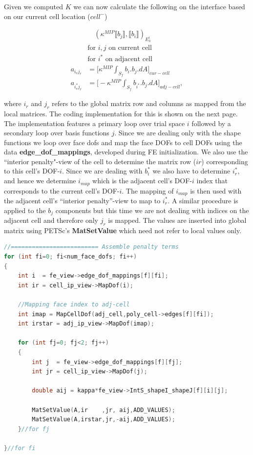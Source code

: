 \documentclass[11pt,letterpaper,titlepage]{article}
\numberwithin{equation}{section}
\begin{document}
Given we computed $K$ we can now calculate the following on the interface
based on our current cell location ($cell^-$)

\begin{equation}
\begin{aligned}
& \quad (\kappa^{MIP} \llbracket b_j \rrbracket,\llbracket b_i \rrbracket)_{E_h^i} \\
&\text{for }i,j \text{ on current cell}\\
&\text{for }i^* \text{ on adjacent cell}\\
a_{i_rj_r} &= \biggr[ \kappa^{MIP} \int_{S_f} b_i.b_j.dA \biggr]_{cur-cell}\\
a_{i_r^*j_r} &= \biggr[ -\kappa^{MIP} \int_{S_f} b_{i^*}.b_j.dA \biggr]_{adj-cell},
\end{aligned}
\end{equation}

where $i_r$ and $j_r$ refers to the global matrix row and columns as 
mapped from the local matrices. The coding implementation for this is 
shown on the next page.
\newline
\newline
The implementation features a primary loop over trial space $i$ followed by a 
secondary loop over basis functions $j$. Since we are dealing only with the 
shape functions we loop over face dofs and map the face DOFs to cell DOFs using
the data \textbf{edge\_dof\_mappings}, developed during FE initialization. We
also use the ``interior penalty"-view of the cell to determine the matrix row
($ir$) corresponding to this cell's DOF-$i$. Since we are dealing with $b_i^*$ 
we also have to determine $i_r^*$, and hence we determine $i_{map}$ which is the
adjacent cell's DOF-$i$ index that corresponds to the current cell's DOF-$i$. 
The mapping of $i_{map}$ is then used with the adjacent cell's 
``interior penalty''-view to map to $i_r^*$. A similar procedure is applied to
the $b_j$ components but this time we are not dealing with indices on the adjacent
cell and therefore only $j_r$ is mapped. The values are inserted into global
matrix using PETSc's \textbf{MatSetValue} which need not refer to local values 
only.
\vspace{0.5cm}
\begin{lstlisting}[language=c++]
//========================= Assemble penalty terms
for (int fi=0; fi<num_face_dofs; fi++)
{
	int i  = fe_view->edge_dof_mappings[f][fi];
	int ir = cell_ip_view->MapDof(i);

	//Mapping face index to adj-cell
	int imap = MapCellDof(adj_cell,poly_cell->edges[f][fi]);
	int irstar = adj_ip_view->MapDof(imap);

	for (int fj=0; fj<2; fj++)
	{
		int j  = fe_view->edge_dof_mappings[f][fj];
		int jr = cell_ip_view->MapDof(j);

		double aij = kappa*fe_view->IntS_shapeI_shapeJ[f][i][j];

		MatSetValue(A,ir    ,jr, aij,ADD_VALUES);
		MatSetValue(A,irstar,jr,-aij,ADD_VALUES);
	}//for fj

}//for fi
\end{lstlisting}
\end{document}
